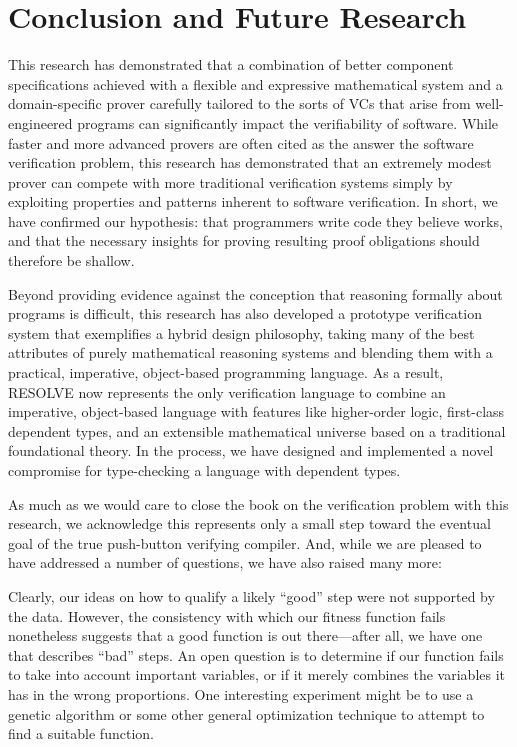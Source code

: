 \chapter{Conclusion and Future Research}\label{ch:conclusion}
This research has demonstrated that a combination of better component specifications achieved with a flexible and expressive mathematical system and a domain-specific prover carefully tailored to the sorts of VCs that arise from well-engineered programs can significantly impact the verifiability of software.  While faster and more advanced provers are often cited as the answer the software verification problem, this research has demonstrated that an extremely modest prover can compete with more traditional verification systems simply by exploiting properties and patterns inherent to software verification.  In short, we have confirmed our hypothesis: that programmers write code they believe works, and that the necessary insights for proving resulting proof obligations should therefore be shallow.

Beyond providing evidence against the conception that reasoning formally about programs is difficult, this research has also developed a prototype verification system that exemplifies a hybrid design philosophy, taking many of the best attributes of purely mathematical reasoning systems and blending them with a practical, imperative, object-based programming language.  As a result, RESOLVE now represents the only verification language to combine an imperative, object-based language with features like higher-order logic, first-class dependent types, and an extensible mathematical universe based on a traditional foundational theory.  In the process, we have designed and implemented a novel compromise for type-checking a language with dependent types.

As much as we would care to close the book on the verification problem with this research, we acknowledge this represents only a small step toward the eventual goal of the true push-button verifying compiler.  And, while we are pleased to have addressed a number of questions, we have also raised many more:

Clearly, our ideas on how to qualify a likely ``good'' step were not supported by the data.  However, the consistency with which our fitness function fails nonetheless suggests that a good function is out there---after all, we have one that describes ``bad'' steps.  An open question is to determine if our function fails to take into account important variables, or if it merely combines the variables it has in the wrong proportions.  One interesting experiment might be to use a genetic algorithm or some other general optimization technique to attempt to find a suitable function.

